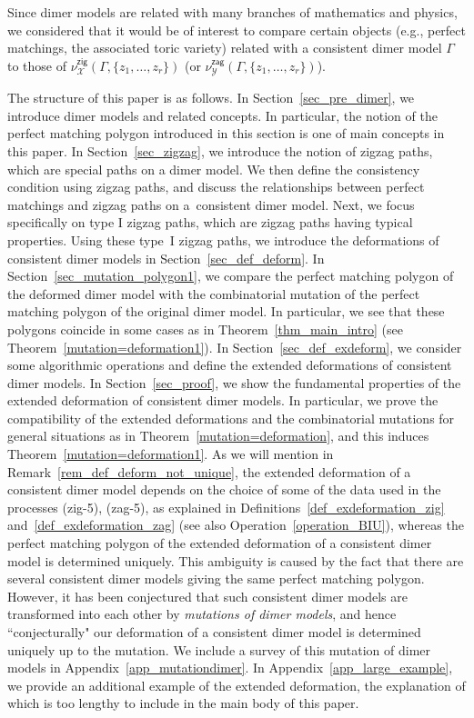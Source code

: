 \documentclass[pdftex]{sigma}%
\numberwithin{equation}{section}
\numberwithin{figure}{section}
\numberwithin{table}{section}
\newcommand{\calX}{\mathcal{X}}
\newcommand{\calY}{\mathcal{Y}}
\newcommand{\zig}{\mathsf{zig}}
\newcommand{\zag}{\mathsf{zag}}
\begin{document}
Since dimer models are related with many branches of mathematics and physics, we considered that it would be of interest to compare certain objects (e.g., perfect matchings, the associated toric variety) related with
a consistent dimer model $\Gamma$ to those of $\nu_\calX^\zig(\Gamma,\{z_1,\dots,z_r\})$ (or $\nu_\calY^\zag(\Gamma,\{z_1,\dots,z_r\})$).

The structure of this paper is as follows.
In Section~\ref{sec_pre_dimer}, we introduce dimer models and related concepts. In particular, the notion of the perfect matching polygon introduced in this section is one of main concepts in this paper.
In Section~\ref{sec_zigzag}, we introduce the notion of zigzag paths, which are special paths on a dimer model.
We then define the consistency condition using zigzag paths, and discuss the relationships between perfect matchings and zigzag paths on a~consistent dimer model.
Next, we focus specifically on type I zigzag paths, which are zigzag paths having typical properties.
Using these type~I zigzag paths, we introduce the deformations of consistent dimer models in Section~\ref{sec_def_deform}.
In Section~\ref{sec_mutation_polygon1}, we compare the perfect matching polygon of the deformed dimer model with
the combinatorial mutation of the perfect matching polygon of the original dimer model.
In particular, we see that these polygons coincide in some cases as in Theorem~\ref{thm_main_intro} (see Theorem~\ref{mutation=deformation1}).
In Section~\ref{sec_def_exdeform}, we consider some algorithmic operations and define the extended deformations of consistent dimer models.
In Section~\ref{sec_proof}, we show the fundamental properties of the extended deformation of consistent dimer models.
In particular, we prove the compatibility of the extended deformations and the combinatorial mutations for general situations as in Theorem~\ref{mutation=deformation}, and this induces Theorem~\ref{mutation=deformation1}.
As we will mention in Remark~\ref{rem_def_deform_not_unique}, the extended deformation of a consistent dimer model
depends on the choice of some of the data used in the processes (zig-5), (zag-5), as explained in
Definitions~\ref{def_exdeformation_zig} and~\ref{def_exdeformation_zag} (see also Operation~\ref{operation_BIU}),
whereas the perfect matching polygon of the extended deformation of a consistent dimer model is determined uniquely.
This ambiguity is caused by the fact that there are several consistent dimer models giving the same perfect matching polygon.
However, it has been conjectured that such consistent dimer models are transformed into each other by \emph{mutations of dimer models}, and hence ``conjecturally" our deformation of a consistent dimer model is determined uniquely up to the mutation.
We include a survey of this mutation of dimer models in Appendix~\ref{app_mutationdimer}.
In Appendix~\ref{app_large_example}, we provide an additional example of the extended deformation, the explanation of which is too lengthy to include in the main body of this paper.
\end{document}
